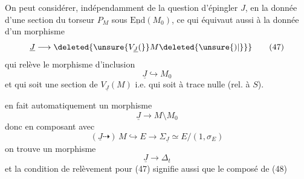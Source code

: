 
On peut considérer, indépendamment de la question d'épingler $J$,   en  la donnée d'une section du torseur $P_M$ sous $\underline{\mathrm{End}}(M_0)$, ce qui équivaut  aussi à la donnée d'un morphisme
\[
\underline J\longrightarrow\deleted{\unsure{V_{\underline J}(}}M\deleted{\unsure{)|\}}} \tag*{(47)}
\]
qui relève le morphisme d'inclusion
\[
\underline J\hookrightarrow M_0
\]
et qui soit une section de $V_{\underline J}(M)$ i.e. qui soit à trace nulle (rel. à $S$).

 en fait automatiquement un morphisme
\[
\underline J\longrightarrow M\setminus M_0
\]
donc en composant avec 
\[
(\underline J\dashrightarrow)\,M\hookrightarrow E\longrightarrow\Sigma_{\underline J}\simeq E/(1,\sigma_E)
\]
on trouve un morphisme
\[
\underline J\longrightarrow\Delta_t \tag*{(48)}
\]
et la condition de relèvement pour (47) signifie aussi que le composé de (48)
